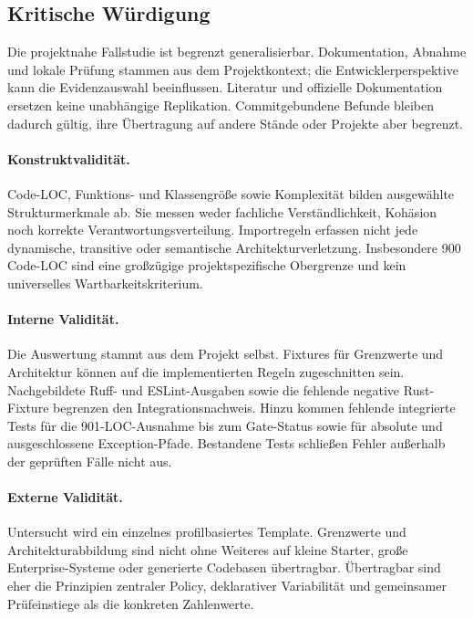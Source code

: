 \subsection{Kritische Würdigung}
\label{subsec:kritische-wuerdigung}

Die projektnahe Fallstudie ist begrenzt generalisierbar. Dokumentation,
Abnahme und lokale Prüfung stammen aus dem Projektkontext; die
Entwicklerperspektive kann die Evidenzauswahl beeinflussen. Literatur und
offizielle Dokumentation ersetzen keine unabhängige Replikation.
Commitgebundene Befunde bleiben dadurch gültig, ihre Übertragung auf andere
Stände oder Projekte aber begrenzt.

\paragraph{Konstruktvalidität.}
Code-LOC, Funktions- und Klassengröße sowie Komplexität bilden ausgewählte
Strukturmerkmale ab. Sie messen weder fachliche Verständlichkeit, Kohäsion noch
korrekte Verantwortungsverteilung. Importregeln erfassen nicht jede
dynamische, transitive oder semantische Architekturverletzung. Insbesondere
900 Code-LOC sind eine großzügige projektspezifische Obergrenze und kein
universelles Wartbarkeitskriterium.

\paragraph{Interne Validität.}
Die Auswertung stammt aus dem Projekt selbst. Fixtures für Grenzwerte und
Architektur können auf die implementierten Regeln zugeschnitten sein.
Nachgebildete Ruff- und ESLint-Ausgaben sowie die fehlende
negative Rust-Fixture begrenzen den Integrationsnachweis. Hinzu kommen fehlende
integrierte Tests für die 901-LOC-Ausnahme bis zum Gate-Status sowie für
absolute und ausgeschlossene Exception-Pfade. Bestandene Tests schließen
Fehler außerhalb der geprüften Fälle nicht aus.

\paragraph{Externe Validität.}
Untersucht wird ein einzelnes profilbasiertes Template. Grenzwerte und
Architekturabbildung sind nicht ohne Weiteres auf kleine Starter, große
Enterprise-Systeme oder generierte Codebasen übertragbar. Übertragbar sind
eher die Prinzipien zentraler Policy, deklarativer Variabilität und gemeinsamer
Prüfeinstiege als die konkreten Zahlenwerte.

